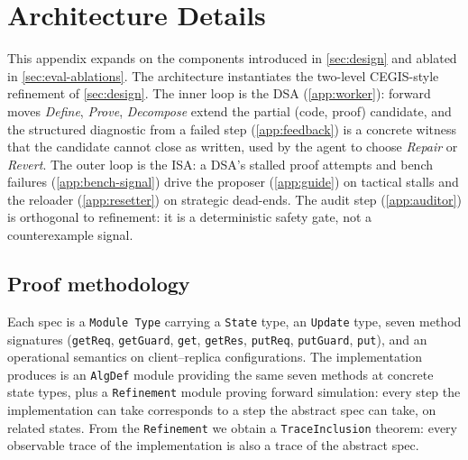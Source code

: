 \section{\sys{} Architecture Details}
\label{app:architecture}

This appendix expands on the components introduced in \cref{sec:design} and ablated in \cref{sec:eval-ablations}. The architecture instantiates the two-level CEGIS-style refinement of \cref{sec:design}. The inner loop is the DSA (\cref{app:worker}): forward moves \emph{Define}, \emph{Prove}, \emph{Decompose} extend the partial (code, proof) candidate, and the structured \coq{} diagnostic from a failed step (\cref{app:feedback}) is a concrete witness that the candidate cannot close as written, used by the agent to choose \emph{Repair} or \emph{Revert}. The outer loop is the ISA: a DSA's stalled proof attempts and bench failures (\cref{app:bench-signal}) drive the proposer (\cref{app:guide}) on tactical stalls and the reloader (\cref{app:resetter}) on strategic dead-ends. The audit step (\cref{app:auditor}) is orthogonal to refinement: it is a deterministic safety gate, not a counterexample signal.

\providecommand{\promptbox}[1]{%
  {\setlength{\fboxsep}{6pt}\setlength{\fboxrule}{0.3pt}%
   \noindent\fcolorbox{specrule}{specbg}{\begin{minipage}{0.96\linewidth}\small #1\end{minipage}}}%
}

\subsection{Proof methodology}
\label{app:proof-method}

Each spec is a \coq{} \texttt{Module Type} carrying a \texttt{State} type, an \texttt{Update} type, seven method signatures (\texttt{getReq}, \texttt{getGuard}, \texttt{get}, \texttt{getRes}, \texttt{putReq}, \texttt{putGuard}, \texttt{put}), and an operational semantics on client--replica configurations. The implementation \sys{} produces is an \texttt{AlgDef} module providing the same seven methods at concrete state types, plus a \texttt{Refinement} module proving forward simulation: every step the implementation can take corresponds to a step the abstract spec can take, on related states. From the \texttt{Refinement} we obtain a \texttt{TraceInclusion} theorem: every observable trace of the implementation is also a trace of the abstract spec.


